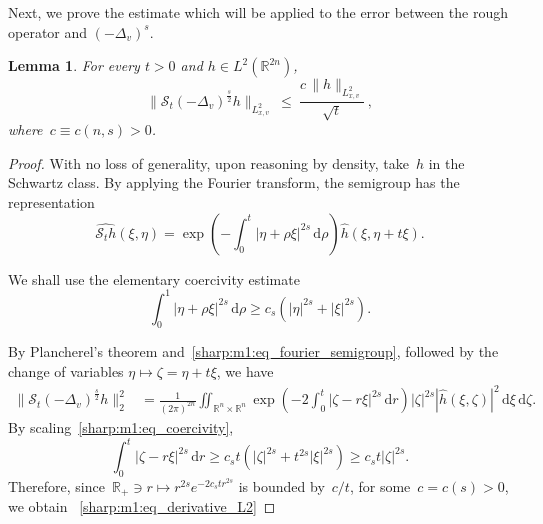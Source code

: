 \documentclass[leqno,10pt]{amsart}
\theoremstyle{plain}
\newtheorem{lemma}{Lemma}[section]
\theoremstyle{remark}
\numberwithin{equation}{section}
\def\er{\mathbb{R}}
\def\ern{\mathbb{R}^n}
\begin{document}
{Next, we prove the estimate which will be applied to the error between the rough operator and $(-\Delta_v)^s$.

\begin{lemma}
\label{sharp:m1:lem_derivative}
For every $t>0$ and $h\in L^2(\er^{2n})$,
\begin{equation}
\label{sharp:m1:eq_derivative_L2}
\|\mathscr{S}_t(-\Delta_v)^\frac{s}{2}h\|_{L^2_{x,v}}
\ \leq  \ \frac{c\,\|h\|_{L^2_{x,v}}}{\sqrt{t}}\,,
\end{equation}
where~$c \equiv c(n,s)>0$.
\end{lemma}

\begin{proof}
With no loss of generality, upon reasoning by density, take~$h$ in the Schwartz class.
By applying the Fourier transform, the semigroup has the representation
\begin{equation}\label{sharp:m1:eq_fourier_semigroup}
\widehat{\mathscr{S}_th}(\xi,\eta)
=
\exp\left(-\int_0^t|\eta+\rho\xi|^{2s}\,\mathrm d\rho\right)
\widehat h(\xi,\eta+t\xi).
\end{equation}


We shall use the elementary coercivity estimate
\begin{equation}
\label{sharp:m1:eq_coercivity}
\int_0^1|\eta+\rho\xi|^{2s}\,\mathrm d\rho
\geq c_s\left(|\eta|^{2s}+|\xi|^{2s}\right).
\end{equation}

By Plancherel's theorem and~\eqref{sharp:m1:eq_fourier_semigroup}, followed by the change of variables $\eta \mapsto \zeta=\eta+t\xi$, we have
\begin{align*}
\|\mathscr{S}_t(-\Delta_v)^\frac{s}{2}h\|_2^2
&= \frac{1}{(2\pi)^{2n}}
\iint_{\ern\times\ern}
\exp\left(-2\int_0^t|\zeta-r\xi|^{2s}\,\mathrm dr\right)
|\zeta|^{2s}|\widehat h(\xi,\zeta)|^2
\,\mathrm d\xi\,\mathrm d\zeta.
\end{align*}
By scaling~\eqref{sharp:m1:eq_coercivity},
$$
\int_0^t|\zeta-r\xi|^{2s}\,\mathrm dr
\geq c_st\left(|\zeta|^{2s}+t^{2s}|\xi|^{2s}\right)
\geq c_st|\zeta|^{2s}.
$$
Therefore, since~$\er_+ \ni r \mapsto r^{2s} e^{-2c_st r^{2s}}$ is bounded by~$c/t$, for some~$c=c(s)>0$, we obtain
~\eqref{sharp:m1:eq_derivative_L2} 
\end{proof}


}
\end{document}
